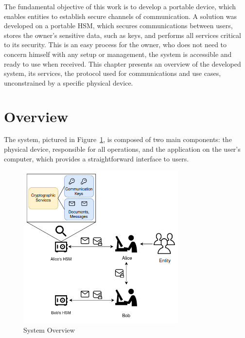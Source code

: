 \cleardoublepage
\label{chap:arch}

The fundamental objective of this work is to develop a portable device,  which enables entities to establish secure channels of communication.
A solution was developed on a portable HSM, which secures communications between users, stores the owner's sensitive data, such as keys, and performs all services critical to its security. This is an easy process for the owner, who does not need to concern himself with any setup or management, the system is accessible and ready to use when received.
This chapter presents an overview of the developed system, its services, the protocol used for communications and use cases, unconstrained by a specific physical device.

\section{Overview}\label{chap:arch:overview}

The system, pictured in Figure~\ref{fig:overview}, is composed of two main components: the physical device, responsible for all operations, and the application on the user's computer, which provides a straightforward interface to users.

\begin{figure}[h]
    \centering
    \includegraphics[width=0.75\textwidth]{./Images/overview2.png}
    \caption{System Overview}
    \label{fig:overview}
\end{figure}

